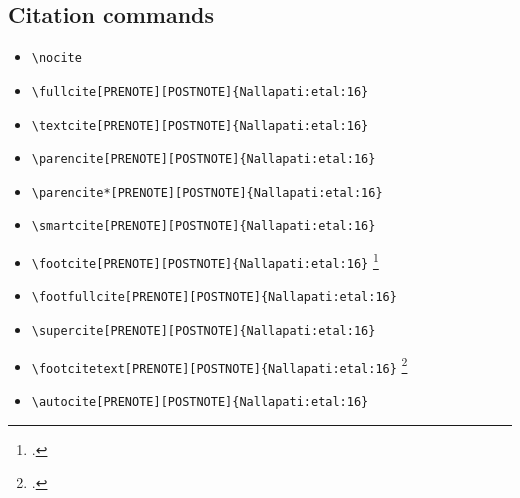 \subsection{Citation commands}

\begin{itemize}
\item \verb=\nocite= \nocite{VanValin:05} \nocite{Abney:87} \nocite{Bach:80,Bach:81} \nocite{Zwicky:93} \nocite{Haagsma:etal:19-casting} \nocite{Corbett:etal:eds:93-heads} \nocite{Mueller:20-grammatical} \nocite{Nallapati:etal:16} \nocite{Penn:99-optimized} \nocite{McConnel:97-PC-PATR}
\item \verb=\fullcite[PRENOTE][POSTNOTE]{Nallapati:etal:16}= \newline  {}
\item \verb=\textcite[PRENOTE][POSTNOTE]{Nallapati:etal:16}= \newline \textcite[PRENOTE][POSTNOTE]{Nallapati:etal:16}
\item \verb=\parencite[PRENOTE][POSTNOTE]{Nallapati:etal:16}= \newline \parencite[PRENOTE][POSTNOTE]{Nallapati:etal:16}
\item \verb=\parencite*[PRENOTE][POSTNOTE]{Nallapati:etal:16}= \newline \parencite*[PRENOTE][POSTNOTE]{Nallapati:etal:16}
\item \verb=\smartcite[PRENOTE][POSTNOTE]{Nallapati:etal:16}= \newline \smartcite[PRENOTE][POSTNOTE]{Nallapati:etal:16}
\item \verb=\footcite[PRENOTE][POSTNOTE]{Nallapati:etal:16}= \newline \footcite[PRENOTE][POSTNOTE]{Nallapati:etal:16}
\item \verb=\footfullcite[PRENOTE][POSTNOTE]{Nallapati:etal:16}= \newline  {}
\item \verb=\supercite[PRENOTE][POSTNOTE]{Nallapati:etal:16}= \newline \supercite[PRENOTE][POSTNOTE]{Nallapati:etal:16}
\item \verb=\footcitetext[PRENOTE][POSTNOTE]{Nallapati:etal:16}= \newline \footcitetext[PRENOTE][POSTNOTE]{Nallapati:etal:16}
\item \verb=\autocite[PRENOTE][POSTNOTE]{Nallapati:etal:16}= \newline  \autocite[PRENOTE][POSTNOTE]{Nallapati:etal:16}

\end{itemize}
